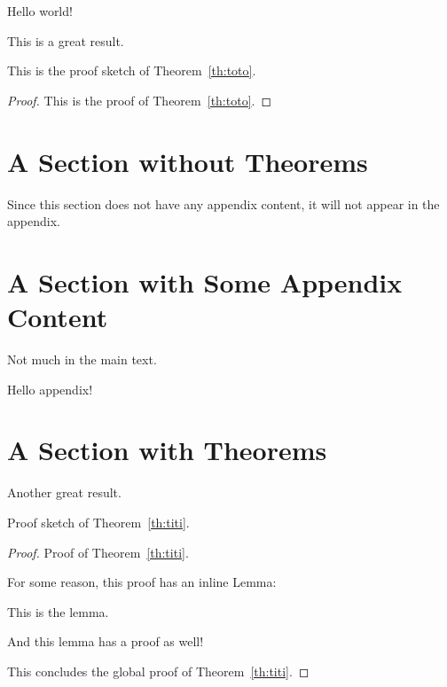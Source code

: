 \usepackage[appendix=inline]{../../apxproof}
\usepackage{hyperref}



Hello world!

\begin{theoremrep}
  \label{th:toto}
  This is a great result.
\end{theoremrep}

\begin{proofsketch}
  This is the proof sketch of Theorem~\ref{th:toto}.
\end{proofsketch}

\begin{proof}
  This is the proof of Theorem~\ref{th:toto}.
\end{proof}

\section{A Section without Theorems}

Since this section does not have any appendix content, it will not appear in the
appendix. \cite{brin1998anatomy}

\section{A Section with Some Appendix Content}

Not much in the main text.

\begin{toappendix}
  Hello appendix!
\end{toappendix}

\section{A Section with Theorems}

\begin{theoremrep}
  \label{th:titi}
  Another great result.
\end{theoremrep}

\begin{proofsketch}
  Proof sketch of Theorem~\ref{th:titi}.
\end{proofsketch}

\begin{proof}
  Proof of Theorem~\ref{th:titi}.

  For some reason, this proof has an inline Lemma:
  \begin{lemma}
    This is the lemma.
  \end{lemma} 

  \begin{nestedproof}
    And this lemma has a proof as well!
  \end{nestedproof}

  This concludes the global proof of Theorem~\ref{th:titi}.
\end{proof}

